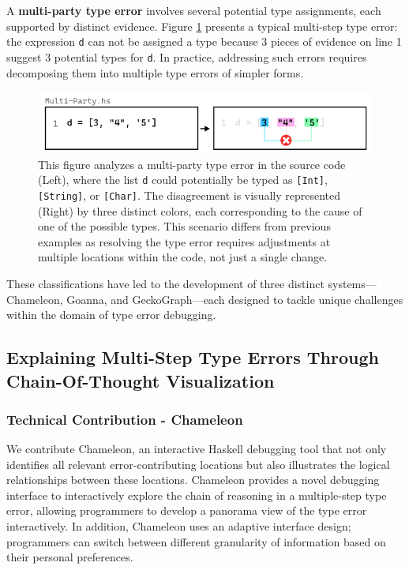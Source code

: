 A \textbf{multi-party type error} involves several potential type assignments, each supported by distinct evidence.  Figure \ref{fig:multi-party-example} presents a typical multi-step type error: the expression \texttt{d} can not be assigned a type because 3 pieces of evidence on line 1 suggest 3 potential types for \texttt{d}. In practice, addressing such errors requires decomposing them into multiple type errors of simpler forms.


\begin{figure}[]
  \includegraphics[width=\linewidth]{Multi-Party}
  \caption[This illustration depicts a multi-party type error in Haskell]{
    \label{fig:multi-party-example}
    This figure analyzes a multi-party type error in the source code (Left), where the list \texttt{d} could potentially be typed as \texttt{[Int]}, \texttt{[String]}, or \texttt{[Char]}. The disagreement is visually represented (Right) by three distinct colors, each corresponding to the cause of one of the possible types. This scenario differs from previous examples as resolving the type error requires adjustments at multiple locations within the code, not just a single change.
       }
\end{figure}

These classifications have led to the development of three distinct systems—Chameleon, Goanna, and GeckoGraph—each designed to tackle unique challenges within the domain of type error debugging.

\subsection{Explaining Multi-Step Type Errors Through Chain-Of-Thought Visualization}

\subsubsection{Technical Contribution - Chameleon}


We contribute Chameleon, an interactive Haskell debugging tool that not only identifies all relevant error-contributing locations but also illustrates the logical relationships between these locations. Chameleon provides a novel debugging interface to interactively explore the chain of reasoning in a multiple-step type error, allowing programmers to develop a panorama view of the type error interactively. In addition, Chameleon uses an adaptive interface design; programmers can switch between different granularity of information based on their personal preferences. 


